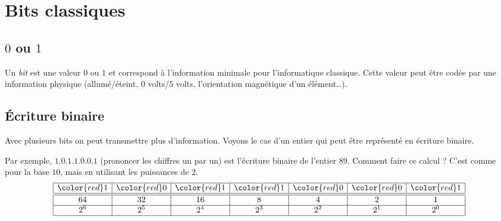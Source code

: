 \documentclass[11pt,class=report,crop=false]{standalone}
\begin{document}








\section{Bits classiques}


\subsection{$0$ ou $1$}

Un \emph{bit} est une valeur $0$ ou $1$ et correspond à l'information minimale pour l'informatique classique.
Cette valeur peut être codée par une information physique (allumé/éteint, $0$ volts/$5$ volts, l'orientation magnétique d'un élément\ldots). 

\subsection{\'Ecriture binaire}


Avec plusieurs bits on peut transmettre plus d'information.
Voyons le cas d'un entier qui peut être représenté en écriture binaire.

Par exemple, $1.0.1.1.0.0.1$ (prononcer les chiffres un par un) est l'écriture binaire de l'entier $89$. Comment faire ce calcul ? C'est comme pour la base $10$, mais en utilisant les puissances de $2$. 
$$
\begin{array}{|c|c|c|c|c|c|c|}
  \hline
  {\color{red}1} & {\color{red}0} & {\color{red}1} & {\color{red}1} & {\color{red}0} & {\color{red}0} & {\color{red}1} \\ 
  \hline\hline
  64 & 32 & 16  & 8 & 4 & 2 & 1 \\\hline
  2^6 & 2^5 & 2^4 & 2^3 & 2^2 & 2^1 & 2^0 \\
  \hline
\end{array}
$$
\end{document}
